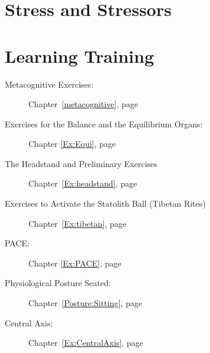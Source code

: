 \documentclass[../main.tex]{subfiles}
\begin{document}
%
\section{Stress and Stressors}

\section{Learning Training}
\begin{description}
\item[Metacognitive Exercises:] Chapter~\ref{metacognitive}, page~\pageref{metacognitive}
\item[Exercises for the Balance and the Equilibrium Organs:] Chapter \ref{Ex:Equi}, page~\pageref{Ex:Equi}
\item[The Headstand and Preliminary Exercises] Chapter~\ref{Ex:headstand}, page~\pageref{Ex:headstand}
\item[Exercises to Activate the Statolith Ball (Tibetan Rites)] Chapter~\ref{Ex:tibetan}, page~\pageref{Ex:tibetan}
\item[PACE:] Chapter \ref{Ex:PACE}, page \pageref{Ex:PACE}
\item[Physiological Posture Seated:] Chapter~\ref{Posture:Sitting}, page~\pageref{Posture:Sitting}
  \item[Central Axis:] Chapter~\ref{Ex:CentralAxis}, page~\pageref{Ex:CentralAxis}
\end{description}
\end{document}

